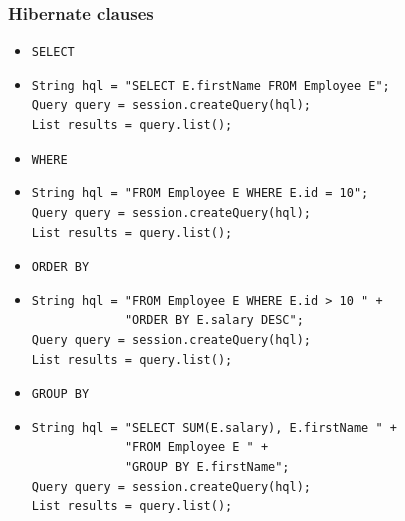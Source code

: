 \documentclass[10pt,xcolor=pdflatex]{beamer}
\begin{document}
\begin{frame}[fragile]\frametitle{Hibernate clauses}
	\begin{itemize}
	        \item \texttt{SELECT}
			\item[]
                \begin{footnotesize}
				\lstset{language=Java}
                \begin{lstlisting}
String hql = "SELECT E.firstName FROM Employee E";
Query query = session.createQuery(hql);
List results = query.list();                
                \end{lstlisting} \end{footnotesize}
			\item \texttt{WHERE}
			\item[]
                \begin{footnotesize}
				\lstset{language=Java}
                \begin{lstlisting}
String hql = "FROM Employee E WHERE E.id = 10";
Query query = session.createQuery(hql);
List results = query.list();                
                \end{lstlisting} \end{footnotesize}
            \item \texttt{ORDER BY}
			\item[]
				\begin{footnotesize}
                \lstset{language=Java}
                \begin{lstlisting}
String hql = "FROM Employee E WHERE E.id > 10 " + 
             "ORDER BY E.salary DESC";
Query query = session.createQuery(hql);
List results = query.list();                
                \end{lstlisting} \end{footnotesize}
            \item \texttt{GROUP BY}
            \item[]
				\begin{footnotesize}
                \lstset{language=Java}
                \begin{lstlisting}
String hql = "SELECT SUM(E.salary), E.firstName " +
             "FROM Employee E " +
             "GROUP BY E.firstName";
Query query = session.createQuery(hql);
List results = query.list();                
                \end{lstlisting} \end{footnotesize}
                \normalsize            
	\end{itemize}
\end{frame}
\end{document}
